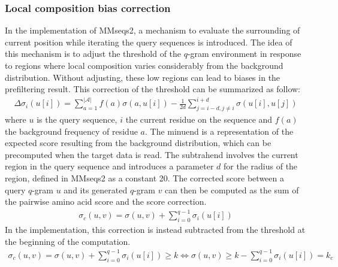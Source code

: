 \documentclass[twoside,a4paper,bsc]{master}
\newcommand{\Qgram}[1]{\(#1\)-gram}
\begin{document}
\subsubsection{Local composition bias correction}
In the implementation of MMseqs2, a mechanism to evaluate the surrounding
of current position while iterating the query sequences is introduced. The
idea of this mechanism is to adjust the threshold of the \Qgram{q}
environment in response to regions where local composition varies
considerably from the background distribution. Without adjusting, these low
regions can lead to biases in the prefiltering result. This correction of
the threshold can be summarized as follow:
\begin{align}
\Delta \sigma_i(u[i]) =
\sum_{a=1}^{|\mathcal{A}|}f(a)\sigma(a,u[i])-\frac{1}{2d}\sum_{j=i-d,j\neq
i}^{i+d}\sigma (u[i],u[j])
\end{align}
where \(u\) is the query sequence, \(i\) the current residue on the
sequence and \(f(a)\) the background frequency of residue \(a\).
The minuend is a representation of the expected score resulting from the
background distribution, which can be precomputed when the target data is
read. The subtrahend involves the current region in the query sequence and
introduces a parameter \(d\) for the radius of the region, defined in
MMseqs2 as a constant 20.
The corrected score between a query \Qgram{q} \(u\) and its generated
\Qgram{q} \(v\) can then be computed as the sum of the pairwise amino acid
score and the score correction.
\begin{align}
\sigma_c(u,v) = \sigma (u,v) + \sum_{i=0}^{q-1} \sigma_i(u[i])
\end{align}
In the implementation, this correction is instead subtracted from the
threshold at the beginning of the computation.
\begin{align}
\sigma_c(u,v) = \sigma (u,v) + \sum_{i=0}^{q-1} \sigma_i(u[i]) \geq k
\Leftrightarrow \sigma (u,v) \geq k - \sum_{i=0}^{q-1} \sigma_i(u[i]) =
k_{c}
\end{align}
\end{document}
